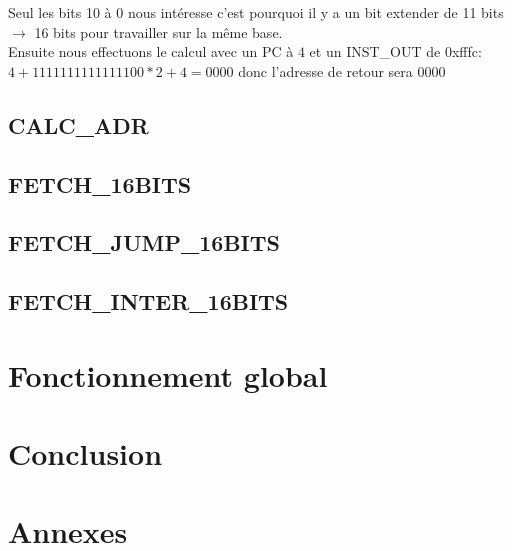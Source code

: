 \documentclass[a4paper]{article} %
\begin{document}
    \medskip
Seul les bits 10 à 0 nous intéresse c'est pourquoi il y a un bit extender de 11 bits $\rightarrow$ 16 bits pour travailler sur la même base.\\
Ensuite nous effectuons le calcul avec un PC à $4$ et un INST\_OUT de 0xfffc: $4 + 1111111111111100 * 2 + 4=0000$ donc l'adresse de retour sera $0000$

\subsection{CALC\_ADR} \label{bl_calc_adr}
\subsection{FETCH\_16BITS}
\subsection{FETCH\_JUMP\_16BITS}
\subsection{FETCH\_INTER\_16BITS}
\section{Fonctionnement global}
\section{Conclusion}
\section{Annexes}
\end{document}
